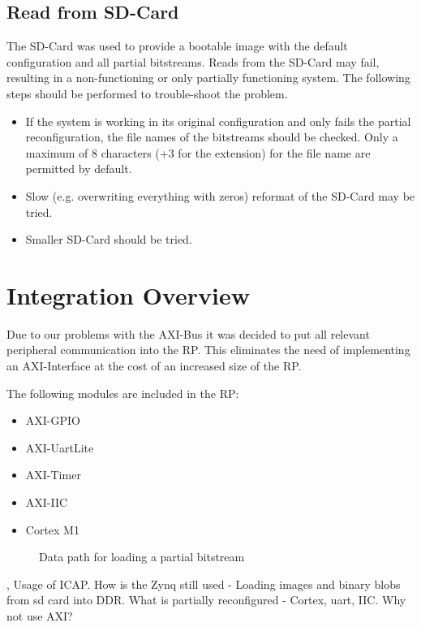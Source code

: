 \subsection{Read from SD-Card}
The SD-Card was used to provide a bootable image with the default configuration and all partial bitstreams.
Reads from the SD-Card may fail, resulting in a non-functioning or only partially functioning system.
The following steps should be performed to trouble-shoot the problem. 

\begin{itemize}
    \item If the system is working in its original configuration and only fails the partial reconfiguration, the file names of the bitstreams should be checked. Only a maximum of 8 characters (+3 for the extension) for the file name are permitted by default. 
    \item Slow (e.g. overwriting everything with zeros) reformat of the SD-Card may be tried.
    \item Smaller SD-Card should be tried.
\end{itemize}
\section{Integration Overview}
Due to our problems with the AXI-Bus it was decided to put all relevant peripheral communication into the \gls{RP}.
This eliminates the need of implementing an AXI-Interface at the cost of an increased size of the \gls{RP}.

The following modules are included in the \gls{RP}:
\begin{itemize}
    \item  AXI-GPIO
    \item  AXI-UartLite
    \item  AXI-Timer
    \item  AXI-IIC
    \item  Cortex M1
\end{itemize}

\begin{figure}[ht]
    \centering
{}
\caption{Data path for loading a partial bitstream}\label{fig:prIntegration}
\end{figure}
\cite{xilinx_vivado_2018-1}, \cite{xilinx_vivado_2018}
Usage of \gls{ICAP}.
How is the Zynq still used - Loading images and binary blobs from sd card into DDR.
What is partially reconfigured - Cortex, uart, IIC.
Why not use AXI?
